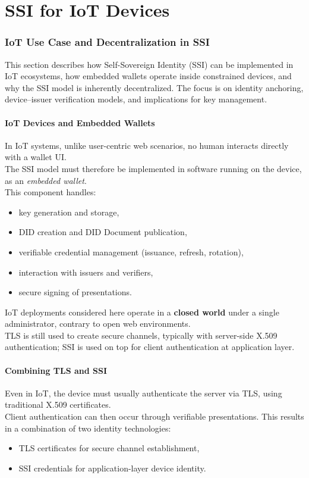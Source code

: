 \section{SSI for IoT Devices}

\subsubsection*{IoT Use Case and Decentralization in SSI}

This section describes how Self-Sovereign Identity (SSI) can be implemented in
IoT ecosystems, how embedded wallets operate inside constrained devices, and why
the SSI model is inherently decentralized. The focus is on identity anchoring,
device–issuer verification models, and implications for key management.

\paragraph{IoT Devices and Embedded Wallets}
In IoT systems, unlike user-centric web scenarios, no human interacts directly
with a wallet UI. \\
The SSI model must therefore be implemented in software running on the device,
as an \textit{embedded wallet}.  \\
This component handles:
\begin{itemize}
    \item key generation and storage,
    \item DID creation and DID Document publication,
    \item verifiable credential management (issuance, refresh, rotation),
    \item interaction with issuers and verifiers,
    \item secure signing of presentations.
\end{itemize}

\noindent
IoT deployments considered here operate in a \textbf{closed world} under a
single administrator, contrary to open web environments.\\
TLS is still used to create secure channels, typically with server-side X.509
authentication; SSI is used on top for client authentication at application
layer.


\paragraph{Combining TLS and SSI}
Even in IoT, the device must usually authenticate the server via TLS, using
traditional X.509 certificates.\\  
Client authentication can then occur through verifiable presentations.  
This results in a combination of two identity technologies:
\begin{itemize}
    \item TLS certificates for secure channel establishment,
    \item SSI credentials for application-layer device identity.
\end{itemize}

